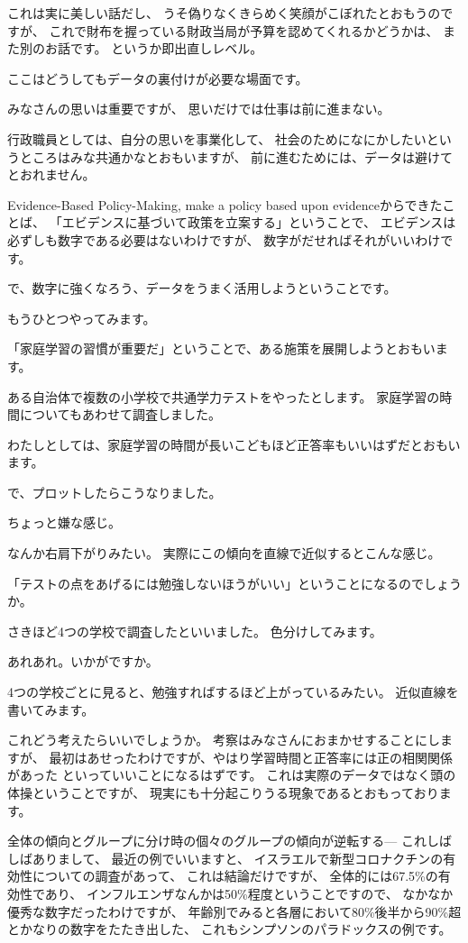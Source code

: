 \documentclass[uplatex,jis2004,dvipdfmx,12pt]{jsarticle}
\begin{document}
これは実に美しい話だし、
うそ偽りなくきらめく笑顔がこぼれたとおもうのですが、
これで財布を握っている財政当局が予算を認めてくれるかどうかは、
また別のお話です。
というか即出直しレベル。

ここはどうしてもデータの裏付けが必要な場面です。

みなさんの思いは重要ですが、
思いだけでは仕事は前に進まない。

行政職員としては、自分の思いを事業化して、
社会のためになにかしたいというところはみな共通かなとおもいますが、
前に進むためには、データは避けてとおれません。

Evidence-Based Policy-Making,
make a policy based upon evidenceからできたことば、
「エビデンスに基づいて政策を立案する」ということで、
エビデンスは必ずしも数字である必要はないわけですが、
数字がだせればそれがいいわけです。

で、数字に強くなろう、データをうまく活用しようということです。

もうひとつやってみます。



「家庭学習の習慣が重要だ」ということで、ある施策を展開しようとおもいます。

ある自治体で複数の小学校で共通学力テストをやったとします。
家庭学習の時間についてもあわせて調査しました。

わたしとしては、家庭学習の時間が長いこどもほど正答率もいいはずだとおもい
ます。

で、プロットしたらこうなりました。

ちょっと嫌な感じ。

なんか右肩下がりみたい。
実際にこの傾向を直線で近似するとこんな感じ。

「テストの点をあげるには勉強しないほうがいい」ということになるのでしょう
か。


さきほど4つの学校で調査したといいました。
色分けしてみます。

あれあれ。いかがですか。

4つの学校ごとに見ると、勉強すればするほど上がっているみたい。
近似直線を書いてみます。

これどう考えたらいいでしょうか。
考察はみなさんにおまかせすることにしますが、
最初はあせったわけですが、やはり学習時間と正答率には正の相関関係があった
といっていいことになるはずです。
これは実際のデータではなく頭の体操ということですが、
現実にも十分起こりうる現象であるとおもっております。

全体の傾向とグループに分け時の個々のグループの傾向が逆転する---
これしばしばありまして、
最近の例でいいますと、
イスラエルで新型コロナクチンの有効性についての調査があって、
これは結論だけですが、
全体的には67.5\%の有効性であり、
インフルエンザなんかは50\%程度ということですので、
なかなか優秀な数字だったわけですが、
年齢別でみると各層において80\%後半から90\%超とかなりの数字をたたき出した、
これもシンプソンのパラドックスの例です。
\end{document}
